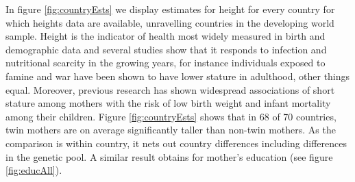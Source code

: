 \documentclass{nature}
\begin{document}
\begin{linenumbers}
In figure \ref{fig:countryEsts} we display estimates for height for every country for which heights data are available, unravelling countries in the developing world sample. Height is the indicator of health most widely measured in birth and demographic data and several studies show that it responds to infection and nutritional scarcity in the growing years, for instance individuals exposed to famine and war have been shown to have lower stature in adulthood, other things equal\cite{Silventoinen2003,Bozzolietal2009,Wangetal2010,Akreshetal2012}. Moreover, previous research has shown widespread associations of short stature among mothers with the risk of low birth weight and infant mortality among their children\cite{BhalotraRawlings2013}.  Figure \ref{fig:countryEsts} shows that in 68 of 70 countries, twin mothers are on average significantly taller than non-twin mothers. As the comparison is within country, it nets out country differences including differences in the genetic pool. A similar result obtains for mother's education\cite{Kenkel1991,CutlerLlerasMuney2010} (see figure \ref{fig:educAll}).


\end{linenumbers}
\end{document}
